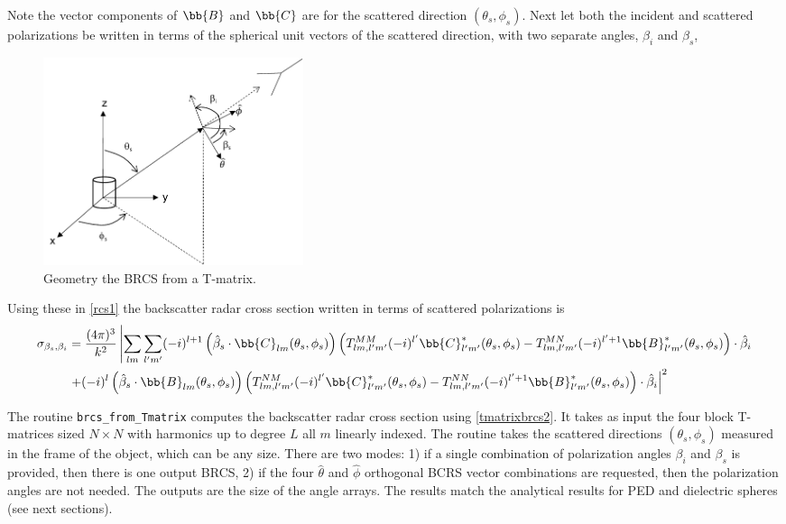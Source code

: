 Note the vector components of $\bb{B}$ and $\bb{C}$ are for the scattered direction $(\theta_s,\phi_s)$. Next let both the incident and scattered polarizations be written in terms of the spherical unit vectors of the scattered direction, with two separate angles, $\beta_i$ and $\beta_s$, 

\begin{figure}[H] 
   \centering
   \includegraphics[width=3in]{Tmatrix/Figures/brcstmatrix} 
   \caption{Geometry the BRCS from a T-matrix.}
   \label{brcstmatrixfig}
\end{figure}



Using these in \eqref{rcs1} the backscatter radar cross section written in terms of scattered polarizations is
\begin{align}
\sigma_{\beta_s,\beta_i} &= \dfrac{(4\pi)^3}{k^2}\left\vert \sum_{lm}\sum_{l'm'} (-i)^{l+1} \left( \hat{\beta}_s\cdot \bb{C}_{lm}(\theta_s,\phi_s) \right)\left(T^{MM}_{lm,l'm'} (-i)^{l'} \bb{C}^*_{l'm'}(\theta_s,\phi_s)  - T^{MN}_{lm,l'm'} (-i)^{l'+1}  \bb{B}^*_{l'm'}(\theta_s,\phi_s)  \right)\cdot \hat{\beta}_i  \right. \nonumber \\
\ &  \left. + (-i)^{l}  \left(  \hat{\beta}_s\cdot\bb{B}_{lm}(\theta_s,\phi_s)\right)\left(T^{NM}_{lm,l'm'} (-i)^{l'} \bb{C}^*_{l'm'}(\theta_s,\phi_s)  - T^{NN}_{lm,l'm'} (-i)^{l'+1} \bb{B}^*_{l'm'}(\theta_s,\phi_s)  \right)\cdot   \hat{\beta}_i   \right\vert^2 \label{tmatrixbrcs2} 
\end{align}


The routine \texttt{brcs\_from\_Tmatrix} computes the backscatter radar cross section using \eqref{tmatrixbrcs2}. It takes as input the four block T-matrices sized $N \times N$ with harmonics up to degree $L$ all $m$ linearly indexed. The routine takes the scattered directions $(\theta_s,\phi_s)$ measured in the frame of the object, which can be any size. There are two modes: 1) if a single combination of polarization angles $\beta_i$ and $\beta_s$ is provided, then there is one output BRCS, 2) if the four $\hat{\theta}$ and $\hat{\phi}$ orthogonal BCRS vector combinations are requested, then the polarization angles are not needed. The outputs are the size of the angle arrays. The results match the analytical results for PED and dielectric spheres (see next sections).


